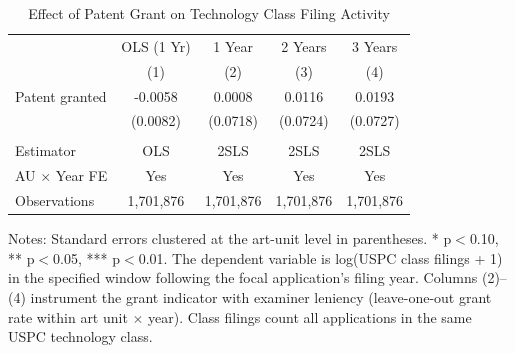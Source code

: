 \begin{table}[H]
\centering
\caption{Effect of Patent Grant on Technology Class Filing Activity}
\begin{threeparttable}
\begin{tabular}{lcccc}
\toprule
 & OLS (1 Yr) & 1 Year & 2 Years & 3 Years \\
 & (1) & (2) & (3) & (4) \\
\midrule
Patent granted & -0.0058 & 0.0008 & 0.0116 & 0.0193 \\
 & (0.0082) & (0.0718) & (0.0724) & (0.0727) \\
 & \\
Estimator & OLS & 2SLS & 2SLS & 2SLS \\
AU $\times$ Year FE & Yes & Yes & Yes & Yes \\
Observations & 1,701,876 & 1,701,876 & 1,701,876 & 1,701,876 \\
\bottomrule
\end{tabular}
\begin{tablenotes}[flushleft]
\small
\item Notes: Standard errors clustered at the art-unit level in parentheses. * p$<$0.10, ** p$<$0.05, *** p$<$0.01. The dependent variable is log(USPC class filings + 1) in the specified window following the focal application's filing year. Columns (2)--(4) instrument the grant indicator with examiner leniency (leave-one-out grant rate within art unit $\times$ year). Class filings count all applications in the same USPC technology class.
\end{tablenotes}
\end{threeparttable}
\label{tab:main}
\end{table}

